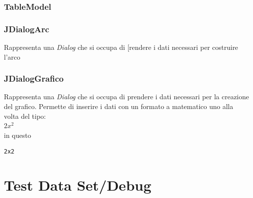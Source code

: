 \documentclass[a4paper,12pt,times,numbered,print,index]{article}
\begin{document}
\subsubsection{TableModel}

\subsubsection{JDialogArc}
Rappresenta una \textit{Dialog} che si occupa di [rendere i dati necessari per costruire l'arco 
\subsubsection{JDialogGrafico}
Rappresenta una \textit{Dialog} che si occupa di prendere i dati necessari per la creazione del grafico. Permette di inserire i dati con un formato a matematico uno alla volta del tipo:\\
$2x^2$\\
in questo
\begin{lstlisting}
2x2
\end{lstlisting}

\section{Test Data Set/Debug}

\printbibliography
\end{document}
